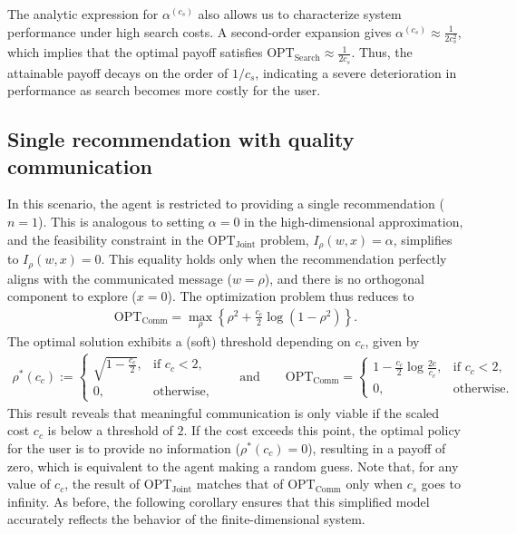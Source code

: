 \documentclass[12pt]{article}
\theoremstyle{definition}
\theoremstyle{remark}
\begin{document}
The analytic expression for $\alpha^(c_s)$ also allows us to characterize system performance under high search costs. A second-order expansion gives $\alpha^(c_s) \approx \frac{1}{2c_s^2}$, which implies that the optimal payoff satisfies $\text{OPT}_{\text{Search}} \approx \frac{1}{2c_s}$. Thus, the attainable payoff decays on the order of $1/c_s$, indicating a severe deterioration in performance as search becomes more costly for the user.

\subsection{Single recommendation with quality communication} In this scenario, the agent is restricted to providing a single recommendation ($n=1$). This is analogous to setting $\alpha = 0$ in the high-dimensional approximation, and the feasibility constraint in the $\text{OPT}_{\text{Joint}}$ problem, $I_{\rho}(w,x) = \alpha$, simplifies to $I_{\rho}(w,x)=0$. This equality holds only when the recommendation perfectly aligns with the communicated message ($w=\rho$), and there is no orthogonal component to explore ($x=0$). The optimization problem thus reduces to
\begin{align*}
    \text{OPT}_{\text{Comm}} = \max_{\rho} \left\{\rho^2 + \frac{c_c}{2} \log (1-\rho^2)\right\}.
\end{align*}
The optimal solution exhibits a (soft) threshold depending on $c_c$, given by
\begin{align*}
\rho^*(c_c) :=
\begin{cases}
    \sqrt{1-\tfrac{c_c}{2}}, & \text{if } c_c < 2, \\[6pt]
    0, & \text{otherwise},
\end{cases}
\qquad \text{and} \qquad
\text{OPT}_{\text{Comm}} = \begin{cases}
    1 - \tfrac{c_c}{2}\log \tfrac{2e}{c_c}, & \text{if } c_c < 2, \\[6pt] 0, & \text{otherwise}.
\end{cases}
\end{align*}
This result reveals that meaningful communication is only viable if the scaled cost $c_c$ is below a threshold of $2$. If the cost exceeds this point, the optimal policy for the user is to provide no information ($\rho^*(c_c)=0$), resulting in a payoff of zero, which is equivalent to the agent making a random guess. Note that, for any value of $c_c$, the result of $\text{OPT}_{\text{Joint}}$ matches that of $\text{OPT}_{\text{Comm}}$ only when $c_s$ goes to infinity. As before, the following corollary ensures that this simplified model accurately reflects the behavior of the finite-dimensional system.
\end{document}
